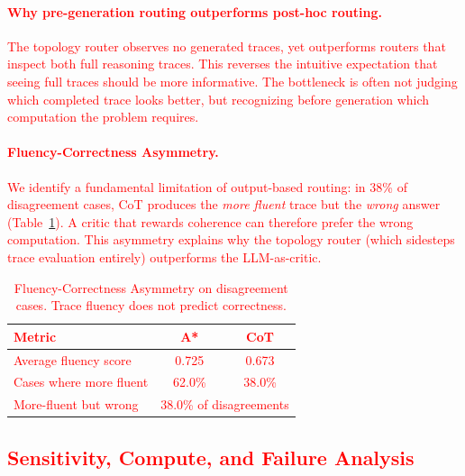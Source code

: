 \documentclass[11pt]{article}
\begin{document}
\textcolor{red}{\paragraph{Why pre-generation routing outperforms post-hoc routing.}
The topology router observes no generated traces, yet outperforms routers that inspect both full reasoning traces. This reverses the intuitive expectation that seeing full traces should be more informative. The bottleneck is often not judging which completed trace looks better, but recognizing before generation which computation the problem requires.}

\textcolor{red}{\paragraph{Fluency-Correctness Asymmetry.}
We identify a fundamental limitation of output-based routing: in 38\% of disagreement cases, CoT produces the \emph{more fluent} trace but the \emph{wrong} answer (Table~\ref{tab:fluency_asymmetry}). A critic that rewards coherence can therefore prefer the wrong computation. This asymmetry explains why the topology router (which sidesteps trace evaluation entirely) outperforms the LLM-as-critic.}

\begin{table}[t]
\centering
\small
\textcolor{red}{
\begin{tabular}{lcc}
\toprule
\textbf{Metric} & \textbf{A*} & \textbf{CoT} \\
\midrule
Average fluency score & 0.725 & 0.673 \\
Cases where more fluent & 62.0\% & 38.0\% \\
More-fluent but wrong & \multicolumn{2}{c}{38.0\% of disagreements} \\
\bottomrule
\end{tabular}}
\caption{\textcolor{red}{Fluency-Correctness Asymmetry on disagreement cases. Trace fluency does not predict correctness.}}
\label{tab:fluency_asymmetry}
\end{table}

\textcolor{red}{\subsection{Sensitivity, Compute, and Failure Analysis}
\label{sec:sensitivity}}
\end{document}
